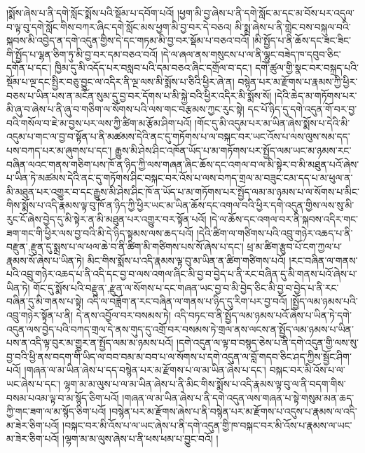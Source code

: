 །སྨོས་ཞེས་པ་ནི་དགེ་སློང་སྨོས་པའི་སྡོམ་པ་དབོག་པའོ། །ཕྱག་མི་བྱ་ཞེས་པ་ནི་དགེ་སློང་མ་དང་མ་བོས་པར་འདུལ་བ་ལྟ་བུ་དགེ་སློང་གིས་བཀར་ཞིང་དགེ་སློང་མས་ཕྱག་མི་བྱ་བར་དེ་བཅའ། མི་སྨྲ་ཞེས་པ་ནི་གླེང་བས་བསྐུལ་བའི་སྐབས་མི་འབྱེད་ན་དགེ་འདུན་གྱིས་དེ་དང་གཏམ་མི་བྱ་བར་སྡོམ་པ་བཅའ་བའོ། །མི་སྤྱོད་པ་ནི་ཆོས་དང་ཟང་ཟིང་གི་སྤྱོད་པ་ལྷན་ཅིག་ཏུ་མི་བྱ་བར་དམ་བཅའ་བའོ། །དེ་ལ་ཞལ་ནས་གསུངས་པ་ལ་ནི་ལྷུང་བཟེད་ཁ་དབུབ་ཅིང་དགོན་པ་དང་། ཁྱིམ་དུ་མི་འདོད་པར་བསླབ་པའི་དམ་བཅའ་ཞིང་དགྲོལ་བ་དང་། དགེ་ཚུལ་གྱི་སྣང་བར་བསྐྲད་པའི་སྡོམ་པ་ལྔ་དང་སྤྱིར་བཅུ་བྱུང་ལ་འདིར་ནི་ལྔ་ལས་མི་སྨོས་པ་ཅིའི་ཕྱིར་ཞེ་ན། བསྙེན་པར་མ་རྫོགས་པ་རྣམས་ཀྱི་ཕྱིར་བཅས་པ་ཡིན་པས་ན་མངོན་སུམ་དུ་བྱ་བར་དོགས་པ་མི་སྐྱེ་བའི་ཕྱིར་འདིར་མི་སྨོས་སོ། །དེའི་ཆེད་མ་གཏོགས་པར་མི་ཞུ་བ་ཞེས་པ་ནི་ཞུ་བ་གཅིག་ལ་སོགས་པའི་ལས་གང་བརྩམས་ཀྱང་རུང་སྟེ། དང་པོ་ཉིད་དུ་དགེ་འདུན་གོ་བར་བྱ་བའི་གསོལ་བ་ཇེ་མ་བྱས་པར་ལས་ཀྱི་ཚིག་མ་རྩོམ་ཤིག་པའོ། །གོང་དུ་མི་འདུམ་པར་མ་ཡིན་ཞེས་སྨོས་པ་དེའི་མི་འདུམ་པ་གང་ལ་བྱ་བ་སྟོན་པ་ནི་མཚམས་དེའི་ནང་དུ་གཏོགས་པ་ལ་བསྐང་བར་ཡང་འོས་པ་ལས་ལུས་སམ་དད་པས་བཀད་པར་མ་ཞུགས་པ་དང་། རྒྱུས་མི་ཤེས་ཤིང་འཁོན་ཡོད་པ་མ་གཏོགས་པར་སྤྱོད་ལམ་ཡང་མ་ཉམས་རང་བཞིན་ལའང་གནས་གཅིག་པས་ཁོ་ན་ཉིད་ཀྱི་ལས་གཞན་ཞིང་ཆོས་དང་འགལ་བ་ལ་མི་སྟེར་བ་མི་མཐུན་པའོ་ཞེས་པ་ཡིན་ཏེ་མཚམས་དེའི་ནང་དུ་གཏོགས་ཤིང་བསྐང་བར་འོས་པ་ལས་བཀད་གྲལ་མ་བཟུང་ངམ་དད་པ་མ་ཕུལ་ན་མི་མཐུན་པར་འགྱུར་བ་དང་རྒྱུས་མི་ཤེས་ཤིང་ཁོ་ན་ཡོད་པ་མ་གཏོགས་པར་སྤྱོད་ལམ་མ་ཉམས་པ་ལ་སོགས་པ་མིང་གིས་སྨོས་པ་འདི་རྣམས་ལྟ་བུ་ཁོ་ན་ཉིད་ཀྱི་ཕྱིར་ཡང་མ་ཡིན་ཆོས་དང་འགལ་བའི་ཕྱིར་དགེ་འདུན་གྱིས་ལས་སུ་མི་རུང་ངོ་ཞེས་བྱེད་དུ་མི་སྟེར་ན་མི་མཐུན་པར་འགྱུར་བར་སྟོན་པའོ། །དེ་ལ་ཆོས་དང་འགལ་བར་ནི་སྐབས་འདིར་གང་ཟག་གང་གི་ཕྱིར་ལས་བྱ་བའི་མི་དེ་ཉིད་སྟམས་ལས་ཆད་པའོ། །དེའི་ཚིག་ལ་གཙིགས་པའི་འབྲུ་གཉེར་འཆད་པ་ནི་{བརྫུན་,རྫུན་}དུ་སྨྲས་པ་ལ་ཕལ་ཆེ་བ་ནི་ཚིག་མི་གཙིགས་པས་སོ་ཞེས་པ་དང་། ཕྲ་མ་ཚིག་རྩུབ་པོ་ངག་ཀྱལ་པ་རྣམས་སོ་ཞེས་པ་ཡིན་ཏེ། མིང་གིས་སྨོས་པ་འདི་རྣམས་ལྟ་བུ་མ་ཡིན་ན་ཚིག་གཙིགས་པའོ། །རང་བཞིན་ལ་གནས་པའི་འབྲུ་གཉེར་འཆད་པ་ནི་འདི་དང་བྱ་བ་ལས་འགལ་ཞིང་མི་བྱ་བ་བྱེད་པ་ནི་རང་བཞིན་དུ་མི་གནས་པའོ་ཞེས་པ་ཡིན་ཏེ། གོང་དུ་སྨོས་པའི་{བརྫུན་,རྫུན་}ལ་སོགས་པ་དང་གཞན་ཡང་བྱ་བ་མི་བྱེད་ཅིང་མི་བྱ་བ་བྱེད་པ་ནི་རང་བཞིན་དུ་མི་གནས་པ་སྟེ། འདི་ལ་བཟློག་ན་རང་བཞིན་ལ་གནས་པ་ཉིད་དུ་རིག་པར་བྱ་བའོ། །སྤྱོད་ལམ་ཉམས་པའི་འབྲུ་གཉེར་སྟོན་པ་ནི། དེ་ནས་འབྱོལ་བར་བསམས་ཏེ། འདི་བཏང་བ་ནི་སྤྱོད་ལམ་ཉམས་པའོ་ཞེས་པ་ཡིན་ཏེ་དགེ་འདུན་ལས་བྱེད་པའི་བཀད་གྲལ་དེ་ནས་གུད་དུ་འགྲོ་བར་བསམས་ཏེ་གྲལ་ནས་ལངས་ན་སྤྱོད་ལམ་ཉམས་པ་ཡིན་པས་ན་འདི་ལྟ་བུར་མ་གྱུར་ན་སྤྱོད་ལམ་མ་ཉམས་པའོ། །དགེ་འདུན་ལ་ལྟ་བ་བསྙད་ཅེས་པ་ནི་དགེ་འདུན་གྱི་ལས་སུ་བྱ་བའི་ཕྱི་ནས་བདག་གི་ཡིད་ལ་བབ་བམ་མ་བབ་པ་ལ་སོགས་པ་དགེ་འདུན་ལ་བློ་གདབ་ཅིང་ཤད་ཀྱིས་སྦྱོང་ཤིག་པའོ། །གཞན་ལ་མ་ཡིན་ཞེས་པ་དད་བསྙེན་པར་མ་རྫོགས་པ་ལ་མ་ཡིན་ཞེས་པ་དང་། བསྐང་བར་མི་འོས་པ་ལ་ཡང་ཞེས་པ་དང་། ལྷག་མ་མ་ལུས་པ་ལ་མ་ཡིན་ཞེས་པ་ནི་མིང་གིས་སྨོས་པ་འདི་རྣམས་ལྟ་བུ་ལ་ནི་བདག་གིས་བསམ་པའམ་ལྟ་བ་མ་སྙོད་ཅིག་པའོ། །གཞན་ལ་མ་ཡིན་ཞེས་པ་ནི་དགེ་འདུན་ལས་གཞན་པ་སྟེ་གསུམ་མན་ཆད་ཀྱི་གང་ཟག་ལ་མ་སྙོད་ཅིག་པའོ། །བསྙེན་པར་མ་རྫོགས་ཞེས་པ་ནི་བསྙེན་པར་མ་རྫོགས་པ་འདུས་པ་རྣམས་ལ་འདི་མ་ཟེར་ཅིག་པའོ། །བསྐང་བར་མི་འོས་པ་ལ་ཡང་ཞེས་པ་ནི་དགེ་འདུན་གྱི་ཁ་བསྐང་བར་མི་འོས་པ་རྣམས་ལ་ཡང་མ་ཟེར་ཅིག་པའོ། །ལྷག་མ་མ་ལུས་ཞེས་པ་ནི་ཕས་ཕམ་པ་བྱུང་བའོ། །
